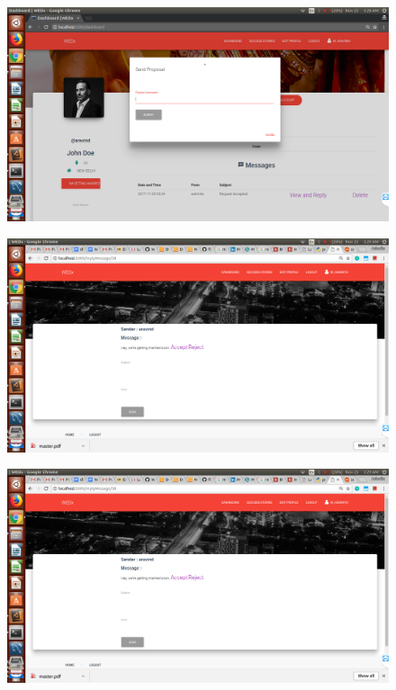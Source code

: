 \documentclass[12pt]{report}
\begin{document}
\begin{figure}[!htb]
    \centering
    \includegraphics[width=1\textwidth]{sc-20.png}
\end{figure}

\begin{figure}[!htb]
    \centering
    \includegraphics[width=1\textwidth]{sc-21.png}
\end{figure}

\begin{figure}[!htb]
    \centering
    \includegraphics[width=1\textwidth]{sc-22.png}
\end{figure}
\end{document}
